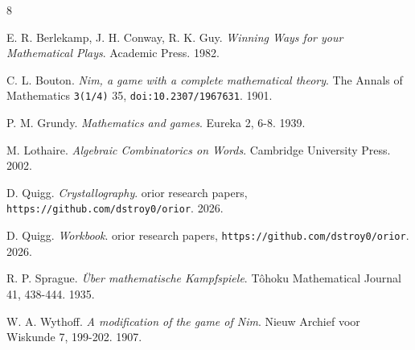 \backmatter
{}
\begin{thebibliography}{8}

E. R. Berlekamp, J. H. Conway, R. K. Guy. \emph{Winning Ways for your Mathematical Plays}. Academic Press. 1982.

C. L. Bouton. \emph{Nim, a game with a complete mathematical theory}. The Annals of Mathematics \texttt{3(1/\allowbreak{}4)} 35, \texttt{doi:10.2307/\allowbreak{}1967631}. 1901.

P. M. Grundy. \emph{Mathematics and games}. Eureka 2, 6-8. 1939.

M. Lothaire. \emph{Algebraic Combinatorics on Words}. Cambridge University Press. 2002.

D. Quigg. \emph{Crystallography}. orior research papers, \texttt{https:/\allowbreak{}/\allowbreak{}github.com/\allowbreak{}dstroy0/\allowbreak{}orior}. 2026.

D. Quigg. \emph{Workbook}. orior research papers, \texttt{https:/\allowbreak{}/\allowbreak{}github.com/\allowbreak{}dstroy0/\allowbreak{}orior}. 2026.

R. P. Sprague. \emph{\"Uber mathematische Kampfspiele}. T\^ohoku Mathematical Journal 41, 438-444. 1935.

W. A. Wythoff. \emph{A modification of the game of Nim}. Nieuw Archief voor Wiskunde 7, 199-202. 1907.

\end{thebibliography}
